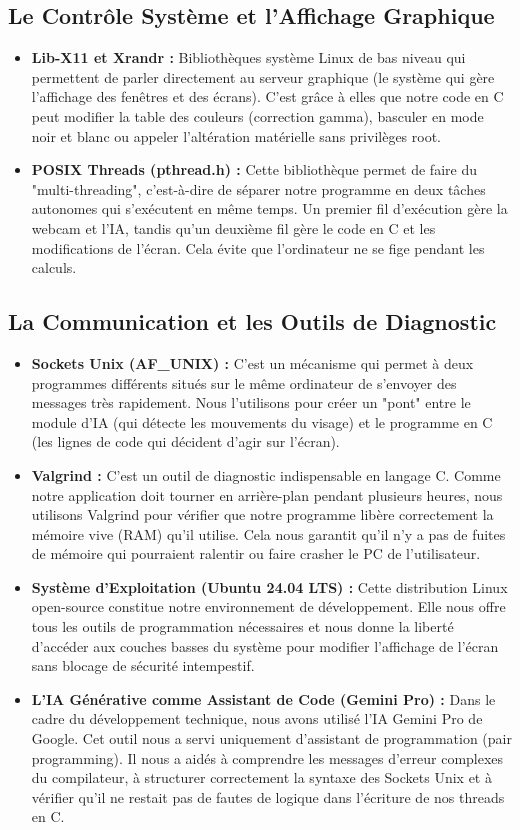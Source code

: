 \documentclass[a4paper, 12pt, twoside]{article}
\begin{document}
\subsection{Le Contrôle Système et l'Affichage Graphique}
\begin{itemize}
    \item \textbf{Lib-X11 et Xrandr :} Bibliothèques système Linux de bas niveau qui permettent de parler directement au serveur graphique (le système qui gère l'affichage des fenêtres et des écrans). C'est grâce à elles que notre code en C peut modifier la table des couleurs (correction gamma), basculer en mode noir et blanc ou appeler l'altération matérielle sans privilèges root.
    \item \textbf{POSIX Threads (pthread.h) :} Cette bibliothèque permet de faire du "multi-threading", c'est-à-dire de séparer notre programme en deux tâches autonomes qui s'exécutent en même temps. Un premier fil d'exécution gère la webcam et l'IA, tandis qu'un deuxième fil gère le code en C et les modifications de l'écran. Cela évite que l'ordinateur ne se fige pendant les calculs.
\end{itemize}

\subsection{La Communication et les Outils de Diagnostic}
\begin{itemize}
    \item \textbf{Sockets Unix (AF\_UNIX) :} C'est un mécanisme qui permet à deux programmes différents situés sur le même ordinateur de s'envoyer des messages très rapidement. Nous l'utilisons pour créer un "pont" entre le module d'IA (qui détecte les mouvements du visage) et le programme en C (les lignes de code qui décident d'agir sur l'écran).
    \item \textbf{Valgrind :} C'est un outil de diagnostic indispensable en langage C. Comme notre application doit tourner en arrière-plan pendant plusieurs heures, nous utilisons Valgrind pour vérifier que notre programme libère correctement la mémoire vive (RAM) qu'il utilise. Cela nous garantit qu'il n'y a pas de fuites de mémoire qui pourraient ralentir ou faire crasher le PC de l'utilisateur.
    \item \textbf{Système d'Exploitation (Ubuntu 24.04 LTS) :} Cette distribution Linux open-source constitue notre environnement de développement. Elle nous offre tous les outils de programmation nécessaires et nous donne la liberté d'accéder aux couches basses du système pour modifier l'affichage de l'écran sans blocage de sécurité intempestif.
    \item \textbf{L'IA Générative comme Assistant de Code (Gemini Pro) :} Dans le cadre du développement technique, nous avons utilisé l'IA Gemini Pro de Google. Cet outil nous a servi uniquement d'assistant de programmation (pair programming). Il nous a aidés à comprendre les messages d'erreur complexes du compilateur, à structurer correctement la syntaxe des Sockets Unix et à vérifier qu'il ne restait pas de fautes de logique dans l'écriture de nos threads en C.
\end{itemize}
\end{document}
